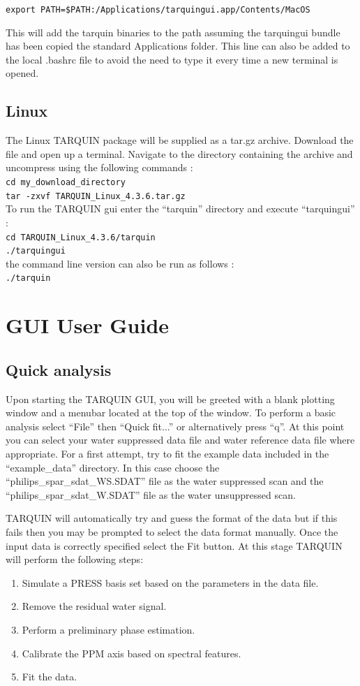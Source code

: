 \documentclass[a4paper,12pt]{article}
\newcommand{\ver}{4.3.6}
\begin{document}
{\tt export PATH=\$PATH:/Applications/tarquingui.app/Contents/MacOS}

This will add the tarquin binaries to the path assuming the tarquingui bundle has been copied the standard Applications folder. This line can also be added to the local .bashrc file to avoid the need to type it every time a new terminal is opened.

\subsection{Linux}
The Linux TARQUIN package will be supplied as a tar.gz archive.  Download the file and open up a terminal.  Navigate to the directory containing the archive and uncompress using the following commands : \\
{\tt cd my\_download\_directory \\
tar -zxvf TARQUIN\_Linux\_\ver.tar.gz} \\
To run the TARQUIN gui enter the ``tarquin'' directory and execute ``tarquingui'' : \\
{\tt cd TARQUIN\_Linux\_\ver/tarquin \\
./tarquingui } \\
the command line version can also be run as follows : \\
{\tt ./tarquin}

\section{GUI User Guide}
\subsection{Quick analysis}
Upon starting the TARQUIN GUI, you will be greeted with a blank plotting window and a menubar located at the top of the window. To perform a basic analysis select ``File'' then ``Quick fit...'' or alternatively press ``q''.  At this point you can select your water suppressed data file and water reference data file where appropriate.  For a first attempt, try to fit the example data included in the ``example\_data'' directory. In this case choose the ``philips\_spar\_sdat\_WS.SDAT'' file as the water suppressed scan and the ``philips\_spar\_sdat\_W.SDAT'' file as the water unsuppressed scan.

TARQUIN will automatically try and guess the format of the data but if this fails then you may be prompted to select the data format manually.  Once the input data is correctly specified select the Fit button.  At this stage TARQUIN will perform the following steps:
\begin{enumerate}
\item Simulate a PRESS basis set based on the parameters in the data file. 
\item Remove the residual water signal.
\item Perform a preliminary phase estimation.
\item Calibrate the PPM axis based on spectral features.
\item Fit the data.
\end{enumerate}
\end{document}

